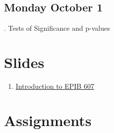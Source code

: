 \documentclass[]{book}
\providecommand{\tightlist}{%
  \setlength{\itemsep}{0pt}\setlength{\parskip}{0pt}}
\let\originaltabular\tabular
\let\endoriginaltabular\endtabular
\renewenvironment{tabular}[1]{%
  \begingroup%
  \centering%
  \originaltabular{#1}}%
  {\endoriginaltabular\endgroup}
\providecommand{\tightlist}{%
  \setlength{\itemsep}{0pt}\setlength{\parskip}{0pt}}
\theoremstyle{definition}
\theoremstyle{definition}
\theoremstyle{definition}
\theoremstyle{remark}
\begin{document}
\section{Monday October 1}\label{monday-october-1}

\begin{table}[H]
\centering
\begin{tabular}{l}
. Tests of Significance and p-values\\
\hline
\end{tabular}
\end{table}

\chapter{Slides}\label{slides}

\begin{enumerate}
\def\labelenumi{\arabic{enumi}.}
\tightlist
\item
  \href{https://docs.google.com/presentation/d/15c0YIS2KJXFzTKgFfQ_xDjTAcvPyQb8JhSLGvsEHJ6o/edit?usp=sharing}{Introduction
  to EPIB 607}
\end{enumerate}

\chapter{Assignments}\label{assignments}
\end{document}
